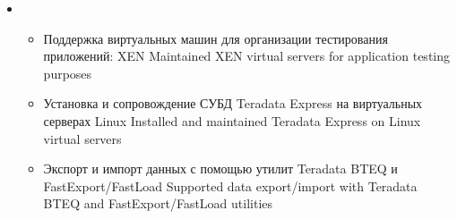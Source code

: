 \documentclass[11pt,a4paper,sans]{moderncv}        %
\begin{document}
{\begin{itemize}
\begin{itemize}
		\end{itemize}
	\item {}
		\begin{itemize}
			\item {}
				{Поддержка виртуальных машин для организации тестирования приложений: XEN}
				{Maintained XEN virtual servers for application testing purposes}
			\item {}
				{Установка и сопровождение СУБД Teradata Express на виртуальных серверах Linux}
				{Installed and maintained Teradata Express on Linux virtual servers}
			\item {}
				{Экспорт и импорт данных с помощью утилит Teradata BTEQ и FastExport/FastLoad}
				{Supported data export/import with Teradata BTEQ and FastExport/FastLoad utilities}
		\end{itemize}
	\end{itemize}
}
\end{document}
